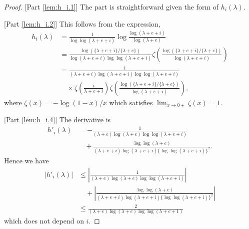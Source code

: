 \documentclass[preprint,11pt]{imsart}
\numberwithin{equation}{section}
\theoremstyle{plain}
\theoremstyle{definition}
\theoremstyle{remark}
\begin{document}
\begin{proof}\mbox{}
 [Part \ref{lem:h_i.1}] The part is straightforward given the form of $h_i(\lambda)$.

 [Part \ref{lem:h_i.2}] This follows from the expression,
 \begin{align*}
 h_i(\lambda)
  &=\frac{1}{\log\log(\lambda+e+i)} \log\frac{\log(\lambda+e+i)}{\log(\lambda+e)}\\
 &=\frac{\log(\{\lambda+e+i\}/\{\lambda+e\})}{\log(\lambda+e+i)\log\log(\lambda+e+i)}\zeta\left(\frac{\log(\{\lambda+e+i\}/\{\lambda+e\})}{\log(\lambda+e+i)}\right) \\
 &=\frac{i}{(\lambda+e+i)\log(\lambda+e+i)\log\log(\lambda+e+i)} \\
 &\quad\times \zeta\left(\frac{i}{\lambda+e+i}\right)\zeta\left(\frac{\log(\{\lambda+e+i\}/\{\lambda+e\})}{\log(\lambda+e+i)}\right),
 \end{align*}
where $\zeta(x)=-\log(1-x)/x$
 which satisfies $\lim_{x\to 0+}\zeta(x)=1$. 

[Part \ref{lem:h_i.4}] The derivative is 
 \begin{align*}
  h'_i(\lambda)&=-\frac{1}{(\lambda+e)\log(\lambda+e)\log\log(\lambda+e+i)} \\
  &\quad +\frac{\log\log(\lambda+e)}{(\lambda+e+i)\log(\lambda+e+i)\{\log\log(\lambda+e+i)\}^2}.
 \end{align*}
Hence we have
\begin{align*}
 |h'_i(\lambda)|&\leq\left|\frac{1}{(\lambda+e)\log(\lambda+e)\log\log(\lambda+e+i)}\right| \\ &\quad +
 \left|\frac{\log\log(\lambda+e)}{(\lambda+e+i)\log(\lambda+e+i)\{\log\log(\lambda+e+i)\}^2}\right| \\
 &\leq \frac{2}{(\lambda+e)\log(\lambda+e)\log\log(\lambda+e+1)}
 \end{align*} 
which does not depend on $i$.


\end{proof}
\end{document}

